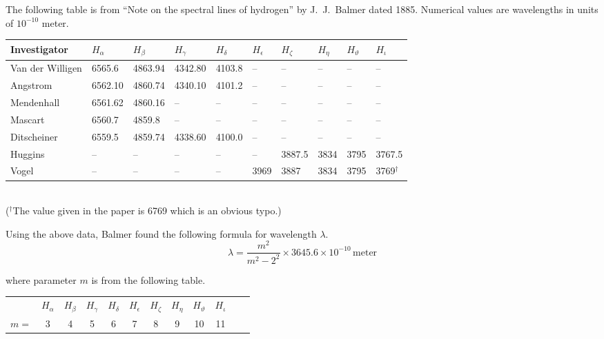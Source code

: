 \documentclass[12pt]{article}
\begin{document}
\noindent
The following table is from
``Note on the spectral lines of hydrogen''
by J.~J.~Balmer dated 1885.
Numerical values are wavelengths in units of $10^{-10}$ meter.
\begin{center}
\footnotesize
\begin{tabular}{|l|l|l|l|l|l|l|l|l|l|}
\hline
Investigator & $H_\alpha$ & $H_\beta$ & $H_\gamma$ & $H_\delta$ & $H_\epsilon$ &
$H_\zeta$ & $H_\eta$ & $H_\vartheta$ & $H_\iota$
\\
\hline
Van der Willigen & 6565.6 & 4863.94 & 4342.80 & 4103.8 & -- & -- & -- & -- & --
\\
Angstrom & 6562.10 & 4860.74 & 4340.10 & 4101.2 & -- & -- & -- & -- & --
\\
Mendenhall & 6561.62 & 4860.16 & -- & -- & -- & -- & -- & -- & --
\\
Mascart & 6560.7 & 4859.8 & -- & -- & -- & -- & -- & -- & --
\\
Ditscheiner & 6559.5 & 4859.74 & 4338.60 & 4100.0 & -- & -- & -- & -- & --
\\
Huggins & -- & -- & -- & -- & -- & 3887.5 & 3834 & 3795 & 3767.5
\\
Vogel & -- & -- & -- & -- & 3969 & 3887 & 3834 & 3795 & 3769${}^\dag$
\\
\hline
\end{tabular}
\\
{\footnotesize(${}^\dag$The value given in the paper is 6769 which is an obvious typo.)}
\end{center}

\noindent
Using the above data, Balmer found the following formula for wavelength $\lambda$.
\begin{equation*}
\lambda=\frac{m^2}{m^2-2^2}\times3645.6\times10^{-10}\,\text{meter}
\end{equation*}

\noindent
where parameter $m$ is from the following table.
\begin{center}
\begin{tabular}{cccccccccccc}
& $H_\alpha$ & $H_\beta$ & $H_\gamma$ & $H_\delta$ & $H_\epsilon$ &
$H_\zeta$ & $H_\eta$ & $H_\vartheta$ & $H_\iota$
\\
$m=$ & 3 & 4 & 5 & 6 & 7 & 8 & 9 & 10 & 11
\end{tabular}
\end{center}
\end{document}
